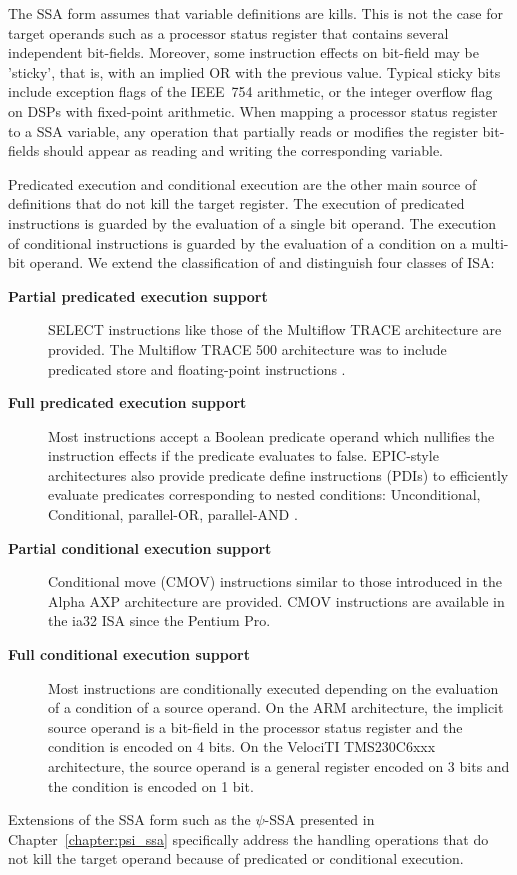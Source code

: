 The SSA form assumes that variable definitions are kills. This is not the case
for target operands such as a processor status register that contains several
independent bit-fields. Moreover, some instruction effects on bit-field may be
'sticky', that is, with an implied OR with the previous value. Typical sticky
bits include exception flags of the IEEE~754 arithmetic, or the integer overflow
flag on DSPs with fixed-point arithmetic. When mapping a processor status
register to a SSA variable, any operation that partially reads or modifies the
register bit-fields should appear as reading and writing the corresponding
variable.

Predicated execution and conditional execution are the other main source of
definitions that do not kill the target register. The execution of predicated
instructions is guarded by the evaluation of a single bit operand. The execution
of conditional instructions is guarded by the evaluation of a condition on a
multi-bit operand. We extend the classification of \cite{Mahlke:1995:ISCA} and
distinguish four classes of ISA: \begin{description}

\item[\bf Partial predicated execution support] SELECT instructions like those
of the Multiflow TRACE architecture \cite{Colwell:1987:ASPLOS} are provided. The
Multiflow TRACE 500 architecture was to include predicated store and
floating-point instructions \cite{Lowney:1993:JS}.

\item[\bf Full predicated execution support] Most instructions accept a Boolean
predicate operand which nullifies the instruction effects if the predicate
evaluates to false. EPIC-style architectures also provide predicate define
instructions (PDIs) to efficiently evaluate predicates corresponding to nested
conditions: Unconditional, Conditional, parallel-OR, parallel-AND
\cite{Gillies:1996:MICRO}.

\item[\bf Partial conditional execution support] Conditional move (CMOV)
instructions similar to those introduced in the Alpha AXP architecture
\cite{Blickstein:1992:DTJ} are provided. CMOV instructions are available in the
ia32 ISA since the Pentium Pro.

\item[\bf Full conditional execution support] Most instructions are
conditionally executed depending on the evaluation of a condition of a source
operand. On the ARM architecture, the implicit source operand is a bit-field in
the processor status register and the condition is encoded on 4 bits. On the
VelociTI{\texttrademark} TMS230C6xxx architecture, the source operand is a
general register encoded on 3 bits and the condition is encoded on 1 bit.

\end{description}
Extensions of the SSA form such as the $\psi$-SSA \cite{Stoutchinin:2001:MICRO}
presented in Chapter~\ref{chapter:psi_ssa} specifically address the handling
operations that do not kill the target operand because of predicated or
conditional execution.

